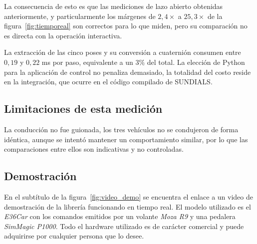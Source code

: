 La consecuencia de esto es que las mediciones de lazo abierto obtenidas anteriormente, y particularmente los márgenes de $2{,}4\times$ a $25{,}3\times$ de la figura~\ref{fig:tiemporeal} son correctos para lo que miden, pero su comparación no es directa con la operación interactiva.



La extracción de las cinco poses y su conversión a cuaternión consumen entre $0{,}19$ y $0{,}22$ ms por paso, equivalente a un $3\%$ del total. La elección de Python para la aplicación de control no penaliza demasiado, la totalidad del costo reside en la integración, que ocurre en el código compilado de SUNDIALS.


\subsection{Limitaciones de esta medición} 
La conducción no fue guionada, los tres vehículos no se condujeron de forma idéntica, aunque se intentó mantener un comportamiento similar, por lo que las comparaciones entre ellos son indicativas y no controladas.

\subsection{Demostración} 

En el subtítulo de la figura~\ref{fig:video_demo} se encuentra el enlace a un video de demostración de la librería funcionando en tiempo real. El modelo utilizado es el \textit{E36Car} con los comandos emitidos por un volante \textit{Moza R9} y una pedalera \textit{SimMagic P1000}. Todo el hardware utilizado es de carácter comercial y puede adquirirse por cualquier persona que lo desee.

